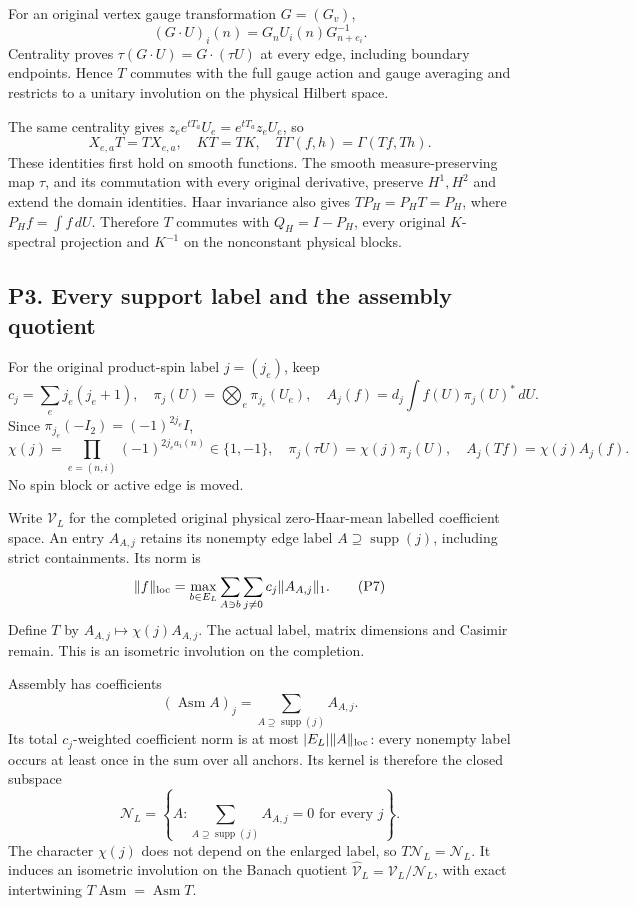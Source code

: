 \documentclass[11pt]{article}
\begin{document}
For an original vertex gauge transformation \(G=(G_v)\),
\[
 (G\cdot U)_i(n)=G_nU_i(n)G_{n+e_i}^{-1}.
\]
Centrality proves \(\tau(G\cdot U)=G\cdot(\tau U)\) at every edge, including boundary endpoints. Hence \(T\) commutes with the full gauge action and gauge averaging and restricts to a unitary involution on the physical Hilbert space.

The same centrality gives \(z_e e^{tT_a}U_e=e^{tT_a}z_eU_e\), so
\[
 X_{e,a}T=TX_{e,a},\quad KT=TK,\quad
 T\Gamma(f,h)=\Gamma(Tf,Th). \tag{P5}
\]
These identities first hold on smooth functions. The smooth measure-preserving map \(\tau\), and its commutation with every original derivative, preserve \(H^1,H^2\) and extend the domain identities. Haar invariance also gives \(TP_H=P_HT=P_H\), where \(P_Hf=\int f\,dU\). Therefore \(T\) commutes with \(Q_H=I-P_H\), every original \(K\)-spectral projection and \(K^{-1}\) on the nonconstant physical blocks.

\subsection*{P3. Every support label and the assembly quotient}

For the original product-spin label \(j=(j_e)\), keep
\[
 c_j=\sum_ej_e(j_e+1),\quad
 \pi_j(U)=\bigotimes_e\pi_{j_e}(U_e),\quad
 A_j(f)=d_j\int f(U)\pi_j(U)^*\,dU.
\]
Since \(\pi_{j_e}(-I_2)=(-1)^{2j_e}I\),
\[
 \chi(j)=\prod_{e=(n,i)}(-1)^{2j_ea_i(n)}\in\{1,-1\},\quad
 \pi_j(\tau U)=\chi(j)\pi_j(U),\quad
 A_j(Tf)=\chi(j)A_j(f). \tag{P6}
\]
No spin block or active edge is moved.

Write \(\mathscr V_L\) for the completed original physical zero-Haar-mean labelled coefficient space. An entry \(A_{A,j}\) retains its nonempty edge label \(A\supseteq\operatorname{supp}(j)\), including strict containments. Its norm is
\[
 \|f\|_{\rm loc}=\max_{b\in E_L}
 \sum_{A\ni b}\sum_{j\ne0}c_j\|A_{A,j}\|_1. \tag{P7}
\]
Define \(T\) by \(A_{A,j}\mapsto\chi(j)A_{A,j}\). The actual label, matrix dimensions and Casimir remain. This is an isometric involution on the completion.

Assembly has coefficients
\[
 (\operatorname{Asm}A)_j=\sum_{A\supseteq\operatorname{supp}(j)}A_{A,j}.
\]
Its total \(c_j\)-weighted coefficient norm is at most \(|E_L|\|A\|_{\rm loc}\): every nonempty label occurs at least once in the sum over all anchors. Its kernel is therefore the closed subspace
\[
 \mathscr N_L=\left\{A:
 \sum_{A\supseteq\operatorname{supp}(j)}A_{A,j}=0
 \text{ for every }j\right\}. \tag{P8}
\]
The character \(\chi(j)\) does not depend on the enlarged label, so \(T\mathscr N_L=\mathscr N_L\). It induces an isometric involution on the Banach quotient \(\widehat{\mathscr V}_L=\mathscr V_L/\mathscr N_L\), with exact intertwining \(T\operatorname{Asm}=\operatorname{Asm}T\).
\end{document}
